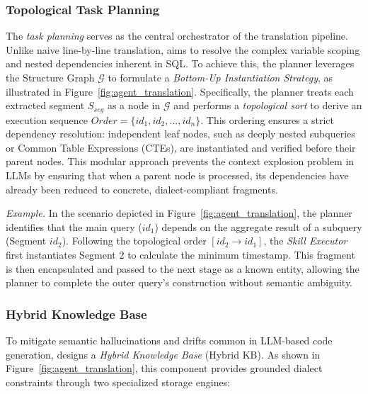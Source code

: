 \documentclass[sigconf,review,anonymous]{acmart}
\begin{document}
\subsubsection{Topological Task Planning}
The \textit{task planning} serves as the central orchestrator of the translation pipeline. Unlike naive line-by-line translation, \tool{} aims to resolve the complex variable scoping and nested dependencies inherent in SQL. To achieve this, the planner leverages the Structure Graph $\mathcal{G}$ to formulate a \textit{Bottom-Up Instantiation Strategy}, as illustrated in Figure~\ref{fig:agent_translation}.
Specifically, the planner treats each extracted segment $S_{seg}$ as a node in $\mathcal{G}$ and performs a \textit{topological sort} to derive an execution sequence $Order = \{id_1, id_2, \dots, id_n\}$. This ordering ensures a strict dependency resolution: independent leaf nodes, such as deeply nested subqueries or Common Table Expressions (CTEs), are instantiated and verified before their parent nodes. This modular approach prevents the context explosion problem in LLMs by ensuring that when a parent node is processed, its dependencies have already been reduced to concrete, dialect-compliant fragments.




\textit{Example.} In the scenario depicted in Figure~\ref{fig:agent_translation}, the planner identifies that the main query ($id_1$) depends on the aggregate result of a subquery (Segment $id_2$). Following the topological order $[id_2 \to id_1]$, the \textit{Skill Executor} first instantiates Segment 2 to calculate the minimum timestamp. This fragment is then encapsulated and passed to the next stage as a known entity, allowing the planner to complete the outer query's construction without semantic ambiguity.

\subsubsection{Hybrid Knowledge Base}%
To mitigate semantic hallucinations and drifts common in LLM-based code generation, \tool{} designs a \textit{Hybrid Knowledge Base} (Hybrid KB). As shown in Figure~\ref{fig:agent_translation}, this component provides grounded dialect constraints through two specialized storage engines:
\end{document}
